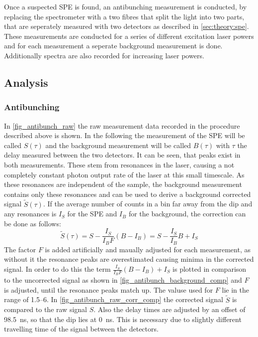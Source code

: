Once a suspected SPE is found, an antibunching measurement is conducted, by replacing the spectrometer with a two fibres that split the light into two parts, that are seperately measured with two detectors as described in \cref{sec:theory:spe}.
These measurements are conducted for a series of different excitation laser powers and for each measurement a seperate background measurement is done. %
Additionally spectra are also recorded for increasing laser powers.

\subsection{Analysis}
\subsubsection{Antibunching}

In \cref{fig_antibunch_raw} the raw measurement data recorded in the procedure described above is shown.
In the following the measurement of the SPE will be called $S(\tau)$ and the background measurement will be called $B(\tau)$ with $\tau$ the delay measured between the two detectors.
It can be seen, that peaks exist in both measurements.
These stem from resonances in the laser, causing a not completely constant photon output rate of the laser at this small timescale.
As these resonances are independent of the sample, the background measurement contains only these resonances and can be used to derive a background corrected signal $\tilde{S} (\tau)$.
If the average number of counts in a bin far away from the dip and any resonances is $I_S$ for the SPE and $I_B$ for the background, the correction can be done as follows:
\begin{equation}
  \tilde{S} (\tau) = S - \frac{I_S}{I_B F} (B-I_B) = S - \frac{I_S}{I_B} B + I_S
\end{equation}
The factor $F$ is added artificially and maually adjusted for each measurement, as without it the resonance peaks are overestimated causing minima in the corrected signal.
In order to do this the term $\frac{I_S}{I_B F} (B-I_B) + I_S$ is plotted in comparison to the uncorrected signal as shown in \cref{fig_antibunch_background_comp} and $F$ is adjusted, until the resonance peaks match up.
The valuse used for $F$ lie in the range of \SIrange{1,5}{6}{}.
In \cref{fig_antibunch_raw_corr_comp} the corrected signal $\tilde{S}$ is compared to the raw signal $S$.
Also the delay times are adjusted by an offset of \SI{98,5}{ns}, so that the dip lies at \SI{0}{ns}.
This is necessary due to slightly different travelling time of the signal between the detectors.


